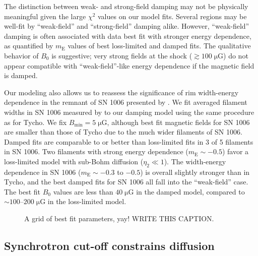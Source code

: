 \documentclass[iop, apj, numberedappendix]{emulateapj}
\newcommand*{\mt}{\mathrm}
\newcommand*{\unit}[1]{\;\mt{#1}}  %
\newcommand*{\abt}{\mathord{\sim}} %
\newcommand*{\mE}{m_\mt{E}}
\newcommand*{\Bmin}{B_{\mt{min}}}
\newcommand*{\muG}{\unit{\mu G}}
\begin{document}
The distinction between weak- and strong-field damping may not
be physically meaningful given the large $\chi^2$ values on our model fits.
Several regions may be well-fit by ``weak-field'' and ``strong-field'' damping
alike.
However, ``weak-field'' damping is often associated with data best fit with
stronger energy dependence, as quantified by $\mE$ values of best loss-limited
and damped fits.  The qualitative behavior of $B_0$ is suggestive; very strong
fields at the shock ($\gtrsim 100 \muG$) do not appear compatible with
``weak-field''-like energy dependence if the magnetic field is damped.


Our modeling also allows us to reassess the significance of rim width-energy
dependence in the remnant of SN 1006 presented by .  We
fit averaged filament widths in SN 1006 measured by  to
our damping model using the same procedure as for Tycho.  We fix $\Bmin = 5
\muG$, although best fit magnetic fields for SN 1006 are smaller than those of
Tycho due to the much wider filaments of SN 1006.
Damped fits are comparable to or better than loss-limited fits in 3 of 5
filaments in SN 1006.  Two filaments with strong energy dependence ($\mE \sim
-0.5$) favor a loss-limited model with sub-Bohm diffusion ($\eta_2 \ll 1$).
The width-energy dependence in SN 1006 ($\mE \sim -0.3$ to $-0.5$) is overall
slightly stronger than in Tycho, and the best damped fits for SN 1006 all fall
into the ``weak-field'' case.  The best fit $B_0$ values are less than $40
\muG$ in the damped model, compared to $\abt 100$--$200 \muG$ in the
loss-limited model.



\begin{figure*}%
    \caption{A grid of best fit parameters, yay!  WRITE THIS CAPTION.}
    \label{fig:pargrid}
\end{figure*}


\subsection{Synchrotron cut-off constrains diffusion}
\end{document}
